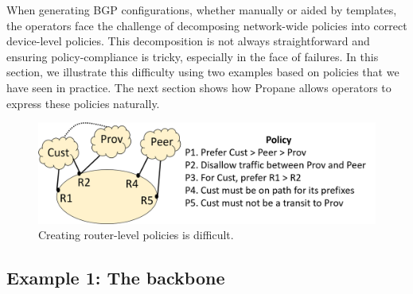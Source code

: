 \documentclass[10pt]{sigalternate052015}
\newcommand{\sysname}{{\small \sf Propane}\xspace}
\begin{document}
%

When generating BGP configurations, whether manually or aided by templates, the operators face the challenge of decomposing network-wide policies
into correct device-level policies.
This decomposition is not always straightforward and ensuring policy-compliance is tricky, especially in the face of failures. In this section, we illustrate this difficulty using two examples based on policies that we have seen in practice. The next section shows how \sysname allows operators to express these policies naturally.

\begin{figure}[t!]
  \centering
  \includegraphics[width=\columnwidth]{figures/example1}
  \caption{Creating router-level policies is difficult.}
  \label{fig:example1}
  \vspace{-1em}
\end{figure}


\subsection{Example 1:  The backbone}
\end{document}
